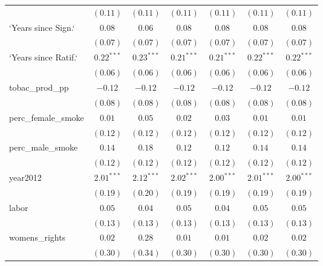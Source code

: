 \begin{table}[!h]
\begin{center}
\begin{tabular}{l c c c c c c }
                        & $(0.11)$     & $(0.11)$     & $(0.11)$     & $(0.11)$     & $(0.11)$     & $(0.11)$     \\
`Years since Sign.`     & $0.08$       & $0.06$       & $0.08$       & $0.08$       & $0.08$       & $0.08$       \\
                        & $(0.07)$     & $(0.07)$     & $(0.07)$     & $(0.07)$     & $(0.07)$     & $(0.07)$     \\
`Years since Ratif.`    & $0.22^{***}$ & $0.23^{***}$ & $0.21^{***}$ & $0.21^{***}$ & $0.22^{***}$ & $0.22^{***}$ \\
                        & $(0.06)$     & $(0.06)$     & $(0.06)$     & $(0.06)$     & $(0.06)$     & $(0.06)$     \\
tobac\_prod\_pp         & $-0.12$      & $-0.12$      & $-0.12$      & $-0.12$      & $-0.12$      & $-0.12$      \\
                        & $(0.08)$     & $(0.08)$     & $(0.08)$     & $(0.08)$     & $(0.08)$     & $(0.08)$     \\
perc\_female\_smoke     & $0.01$       & $0.05$       & $0.02$       & $0.03$       & $0.01$       & $0.01$       \\
                        & $(0.12)$     & $(0.12)$     & $(0.12)$     & $(0.12)$     & $(0.12)$     & $(0.12)$     \\
perc\_male\_smoke       & $0.14$       & $0.18$       & $0.12$       & $0.12$       & $0.14$       & $0.14$       \\
                        & $(0.12)$     & $(0.12)$     & $(0.12)$     & $(0.12)$     & $(0.12)$     & $(0.12)$     \\
year2012                & $2.01^{***}$ & $2.12^{***}$ & $2.02^{***}$ & $2.00^{***}$ & $2.01^{***}$ & $2.00^{***}$ \\
                        & $(0.19)$     & $(0.20)$     & $(0.19)$     & $(0.19)$     & $(0.19)$     & $(0.19)$     \\
labor                   & $0.05$       & $0.04$       & $0.05$       & $0.04$       & $0.05$       & $0.05$       \\
                        & $(0.13)$     & $(0.13)$     & $(0.13)$     & $(0.13)$     & $(0.13)$     & $(0.13)$     \\
womens\_rights          & $0.02$       & $0.28$       & $0.01$       & $0.01$       & $0.02$       & $0.02$       \\
                        & $(0.30)$     & $(0.34)$     & $(0.30)$     & $(0.30)$     & $(0.30)$     & $(0.30)$     \\

\end{tabular}
\end{center}
\end{table}
